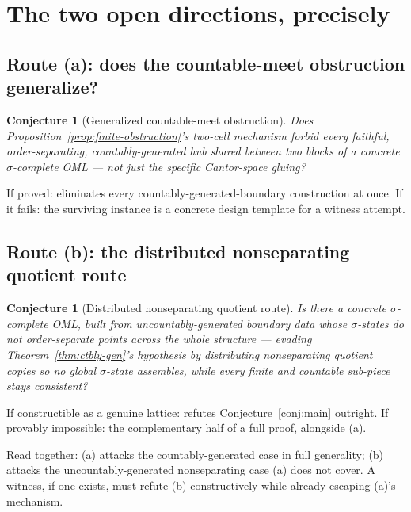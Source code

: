 \documentclass[11pt]{article}
\newtheorem{conjecture}[theorem]{Conjecture}
\theoremstyle{remark}
\begin{document}
\section{The two open directions, precisely}

\subsection{Route (a): does the countable-meet obstruction generalize?}

\begin{conjecture}[Generalized countable-meet obstruction]
\label{conj:route-a}
Does Proposition~\ref{prop:finite-obstruction}'s two-cell mechanism forbid
\emph{every} faithful, order-separating, countably-generated hub shared
between two blocks of a concrete $\sigma$-complete OML — not just the
specific Cantor-space gluing?
\end{conjecture}

If proved: eliminates every countably-generated-boundary construction at
once. If it fails: the surviving instance is a concrete design template for
a witness attempt.

\subsection{Route (b): the distributed nonseparating quotient route}

\begin{conjecture}[Distributed nonseparating quotient route]
\label{conj:route-b}
Is there a concrete $\sigma$-complete OML, built from uncountably-generated
boundary data whose $\sigma$-states do \emph{not} order-separate points
across the whole structure — evading Theorem~\ref{thm:ctbly-gen}'s
hypothesis by distributing nonseparating quotient copies so no global
$\sigma$-state assembles, while every finite and countable sub-piece stays
consistent?
\end{conjecture}

If constructible as a genuine lattice: refutes Conjecture~\ref{conj:main}
outright. If provably impossible: the complementary half of a full proof,
alongside (a).

Read together: (a) attacks the countably-generated case in full generality;
(b) attacks the uncountably-generated nonseparating case (a) does not cover.
A witness, if one exists, must refute (b) constructively while already
escaping (a)'s mechanism.
\end{document}
